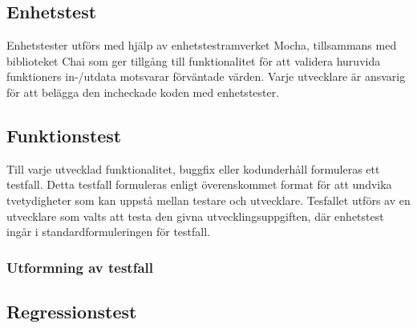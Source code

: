 \subsection{Enhetstest}
Enhetstester utförs med hjälp av enhetstestramverket Mocha, tillsammans med biblioteket Chai som ger tillgång till funktionalitet för att validera huruvida funktioners in-/utdata motsvarar förväntade värden. Varje utvecklare är ansvarig för att belägga den incheckade koden med enhetstester. 

\subsection{Funktionstest}
Till varje utvecklad funktionalitet, buggfix eller kodunderhåll formuleras ett testfall. Detta testfall formuleras enligt överenskommet format för att undvika tvetydigheter som kan uppstå mellan testare och utvecklare. Tesfallet utförs av en utvecklare som valts att testa den givna utvecklingsuppgiften, där enhetstest ingår i standardformuleringen för testfall. 

\subsubsection{Utformning av testfall}


\subsection{Regressionstest}




